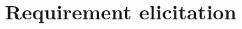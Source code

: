 \documentclass[a4paper]{article}
\begin{document}
\section{Requirement elicitation}


\end{document}
